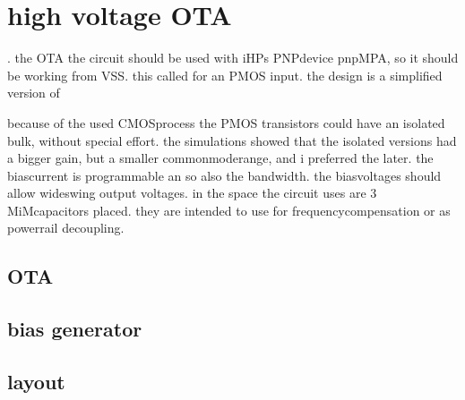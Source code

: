 \documentclass[letterpaper,10pt,english]{sphinxmanual}
\begin{document}
\sphinxstepscope


\chapter{high voltage OTA}
\label{\detokenize{ota:high-voltage-ota}}\label{\detokenize{ota::doc}}
. the OTA
the circuit should be used with iHPs PNP\sphinxhyphen{}device pnpMPA, so it should be working from VSS. this called for an PMOS input. the design is a simplified version of

\sphinxAtStartPar
because of the used CMOS\sphinxhyphen{}process the PMOS transistors could have an isolated bulk, without special effort. the simulations showed that the isolated versions had a bigger gain, but a smaller common\sphinxhyphen{}mode\sphinxhyphen{}range, and i preferred the later.
the bias\sphinxhyphen{}current is programmable an so also the band\sphinxhyphen{}width. the bias\sphinxhyphen{}voltages should allow wide\sphinxhyphen{}swing output voltages.
in the space the circuit uses are 3 MiM\sphinxhyphen{}capacitors placed. they are intended to use for frequency\sphinxhyphen{}compensation or as power\sphinxhyphen{}rail decoupling.


\section{OTA}
\label{\detokenize{ota:ota}}


\section{bias generator}
\label{\detokenize{ota:bias-generator}}


\section{layout}
\label{\detokenize{ota:layout}}
\end{document}
